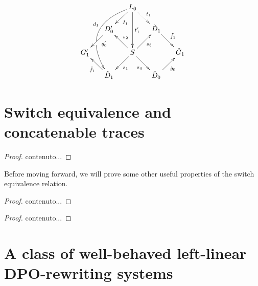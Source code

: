 \[\xymatrix@R=15pt@C=15pt{&&L_ 0\ar[dl]^{I_1} \ar@/_1.2cm/[dddl]_(.4){d_1}|(.63)\hole\ar[dd]^{t'_1} \ar@{.>}[dr]^{t_1}\\&D'_0 \ar[dl]^(.4){g'_0}&&\tilde{D}_1 \ar[dr]^{\tilde{f}_1}\\G'_1 && S\ar[dr]_{s_4} \ar[ur]_{s_3}\ar[dl]^{s_1} \ar[ul]_{s_2}&&\hat{G}_1\\& \hat{D}_1 \ar[ul]^{\hat{f}_1}&&\hat{D}_0 \ar[ur]_{\hat{g}_0}}\]

\section{Switch equivalence and concatenable traces}

\begin{lemma}
\end{lemma}
\begin{proof}
	contenuto...
\end{proof}
\begin{definition}
\end{definition}

Before moving forward, we will prove some other useful properties of the switch equivalence relation.

\begin{lemma}
\end{lemma}
\begin{proof}
	contenuto...
\end{proof}


\begin{theorem}
\end{theorem}
\begin{proof}
	contenuto...
\end{proof}




\section{A class of well-behaved left-linear DPO-rewriting systems}
